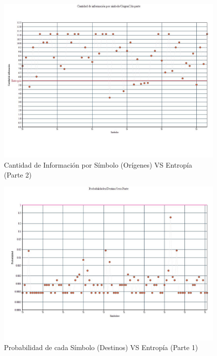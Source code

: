 \begin{figure}[H]
  \centering
    \includegraphics[scale=0.45]{imagenes/graficos/entropiaCantInf/02origen2daParte.jpg}
  \caption{Cantidad de Información por Símbolo (Orígenes) VS Entropía (Parte 2)}
  \label{fig:4}
\end{figure}

\newpage

\begin{figure}[H]
  \centering
    \includegraphics[scale=0.45]{imagenes/graficos/Probabilidades/02destino1eraParte.jpg}
  \caption{Probabilidad de cada Símbolo (Destinos) VS Entropía (Parte 1)}
  \label{fig:5}
\end{figure}

